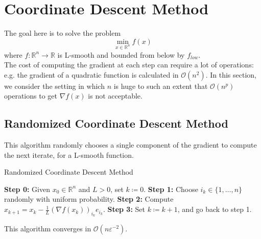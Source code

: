 \documentclass[12pt, openany]{report}
\newcommand{\R}{\mathbb{R}}
\theoremstyle{definition}
\begin{document}
\chapter{Coordinate Descent Method}
The goal here is to solve the problem
\begin{equation}
    \min_{x\in \R^n}f(x) 
\end{equation}
where \(f:\R^n\rightarrow \R\) is L-smooth and bounded from below by \(f_{low}\).\\

The cost of computing the gradient at each step can require a lot of operations: e.g. the gradient of a quadratic function is calculated in \(\mathcal{O}(n^2)\). In this section, we consider the setting in which \(n\) is huge to such an extent that \(\mathcal{O}(n^p)\) operations to get \(\nabla f(x)\) is not acceptable. 
\section{Randomized Coordinate Descent Method}
This algorithm randomly chooses a single component of the gradient to compute the next iterate, for a L-smooth function.
\begin{algorithm}
    \caption{Randomized Coordinate Descent Method}\label{algo:random_CDM}
    \begin{algorithmic}[1]
    \State \textbf{Step 0:} Given $x_0 \in \mathbb{R}^n$ and $L > 0$, set $k \coloneqq 0$.
    \State \textbf{Step 1:} Choose \(i_k\in \{1,\dots,n\}\) randomly with uniform probability. 
    \State \textbf{Step 2:} Compute $x_{k+1} = x_k - \frac{1}{L}\left(\nabla f(x_k)\right)_{i_k}e_{i_k}$.
    \State \textbf{Step 3:} Set \(k\coloneqq k+1\), and go back to step 1.
    \end{algorithmic}
\end{algorithm}
This algorithm converges in \(\mathcal{O}(n\varepsilon^{-2})\). 
\end{document}
